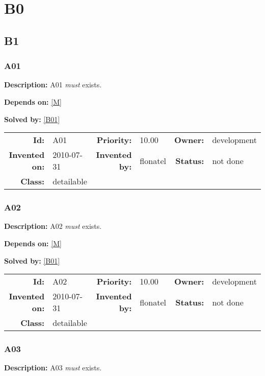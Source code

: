 \chapter{B0}
\section{B1}
\subsection{A01}\label{A01}
\textbf{Description:} A01 \textsl{must} exists.

\textbf{Depends on:} \ref{M} 

\textbf{Solved by:} \ref{B01} 

\par
{\small \begin{center}\begin{tabular}{rlrlrl}
\textbf{Id:} & A01  & \textbf{Priority:} & 10.00  & \textbf{Owner:} & development\\ 
\textbf{Invented on:} & 2010-07-31  & \textbf{Invented by:} & flonatel  & \textbf{Status:} & not done \\ 
\textbf{Class:} & detailable  & & & \end{tabular}\end{center} }

\subsection{A02}\label{A02}
\textbf{Description:} A02 \textsl{must} exists.

\textbf{Depends on:} \ref{M} 

\textbf{Solved by:} \ref{B01} 

\par
{\small \begin{center}\begin{tabular}{rlrlrl}
\textbf{Id:} & A02  & \textbf{Priority:} & 10.00  & \textbf{Owner:} & development\\ 
\textbf{Invented on:} & 2010-07-31  & \textbf{Invented by:} & flonatel  & \textbf{Status:} & not done \\ 
\textbf{Class:} & detailable  & & & \end{tabular}\end{center} }

\subsection{A03}\label{A03}
\textbf{Description:} A03 \textsl{must} exists.

